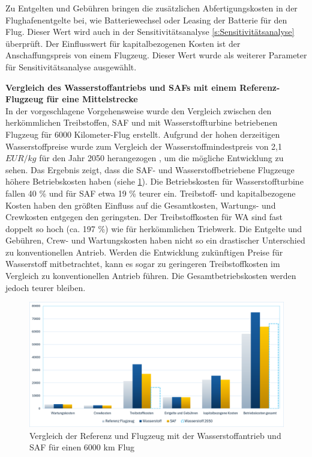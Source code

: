 Zu Entgelten und Gebühren bringen die zusätzlichen Abfertigungskosten in der Flughafenentgelte bei, wie Batteriewechsel oder Leasing der Batterie
für den Flug. Dieser Wert wird auch in der Sensitivitätsanalyse \ref{s:Sensitivitätsanalyse} überprüft. Der Einflusswert für kapitalbezogenen Kosten ist
der Anschaffungspreis von einem Flugzeug. Dieser Wert wurde als weiterer Parameter für Sensitivitätsanalyse ausgewählt.

\textbf{Vergleich des Wasserstoffantriebs und SAFs mit einem Referenz-Flugzeug für eine Mittelstrecke}\\
In der vorgeschlagene Vorgehensweise wurde den Vergleich zwischen den herkömmlichen Treibstoffen, SAF
und mit Wasserstoffturbine betriebenen Flugzeug für 6000 Kilometer-Flug erstellt. %
Aufgrund der hohen derzeitigen Wasserstoffpreise wurde zum Vergleich der Wasserstoffmindestpreis von 2,1 $EUR/kg$ für den 
Jahr 2050 herangezogen \cite{hoelzen2022hydrogen}, um die mögliche Entwicklung zu sehen.
%
Das Ergebnis zeigt, dass die SAF- und Wasserstoffbetriebene Flugzeuge höhere Betriebskosten haben (siehe \ref{vergleichWA_Ref}).
Die Betriebskosten für Wasserstoffturbine fallen 40 \% und für SAF etwa 19 \% teurer ein.
Treibstoff- und kapitalbezogene Kosten haben den größten Einfluss auf die Gesamtkosten, Wartungs- und Crewkosten entgegen den geringsten.
Der Treibstoffkosten für WA sind fast doppelt so hoch (ca. 197 \%) wie für herkömmlichen Triebwerk. Die Entgelte und Gebühren, 
Crew- und Wartungskosten haben nicht so ein drastischer Unterschied zu konventionellen Antrieb.
%
Werden die Entwicklung zukünftigen Preise für Wasserstoff mitbetrachtet, kann es sogar zu geringeren Treibstoffkosten im Vergleich 
zu konventionellen Antrieb führen. Die Gesamtbetriebskosten werden jedoch teurer bleiben.

\begin{figure}[h]
	\centering
	\includegraphics[width=0.9\linewidth]{Bilder/VergleichWA_SAF.png}
	\caption[Betriebskosten]{Vergleich der Referenz und Flugzeug mit der Wasserstoffantrieb und SAF für einen 6000 km Flug}
	\label{vergleichWA_Ref}
\end{figure}

